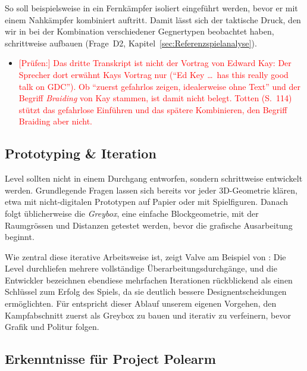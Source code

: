 \documentclass[../Main.tex]{subfiles}
\begin{document}
So soll beispielsweise in  ein Fernkämpfer isoliert eingeführt werden, bevor er mit einem Nahkämpfer kombiniert auftritt. Damit lässt sich der taktische Druck, den wir in  bei der Kombination verschiedener Gegnertypen beobachtet haben, schrittweise aufbauen (Frage~D2, Kapitel~\ref{sec:Referenzspielanalyse}).

\begin{itemize}[leftmargin=1.5cm]
    \item \textcolor{red}{[Prüfen:] Das dritte Transkript ist nicht der Vortrag von Edward Kay: Der Sprecher dort erwähnt Kays Vortrag nur (\enquote{Ed Key \ldots\ has this really good talk on GDC}). Ob \enquote{zuerst gefahrlos zeigen, idealerweise ohne Text} und der Begriff \textit{Braiding} von Kay stammen, ist damit nicht belegt. Totten (S.~114) stützt das gefahrlose Einführen und das spätere Kombinieren, den Begriff Braiding aber nicht.}
\end{itemize}

\subsection{Prototyping \& Iteration} \label{sec:Prototyping}
Level sollten nicht in einem Durchgang entworfen, sondern schrittweise entwickelt werden. Grundlegende Fragen lassen sich bereits vor jeder 3D-Geometrie klären, etwa mit nicht-digitalen Prototypen auf Papier oder mit Spielfiguren. Danach folgt üblicherweise die \textit{Greybox}, eine einfache Blockgeometrie, mit der Raumgrössen und Distanzen getestet werden, bevor die grafische Ausarbeitung beginnt.\autocite[124--126]{totten2014architectural}

Wie zentral diese iterative Arbeitsweise ist, zeigt Valve am Beispiel von \autocite{valve_halflife2_2004}: Die Level durchliefen mehrere vollständige Überarbeitungsdurchgänge, und die Entwickler bezeichnen ebendiese mehrfachen Iterationen rückblickend als einen Schlüssel zum Erfolg des Spiels, da sie deutlich bessere Designentscheidungen ermöglichten.\autocite{jacobson2005postmortem} Für  entspricht dieser Ablauf unserem eigenen Vorgehen, den Kampfabschnitt zuerst als Greybox zu bauen und iterativ zu verfeinern, bevor Grafik und Politur folgen.

\subsection{Erkenntnisse für Project Polearm} \label{sec:ZwischenfazitLD}
\end{document}
